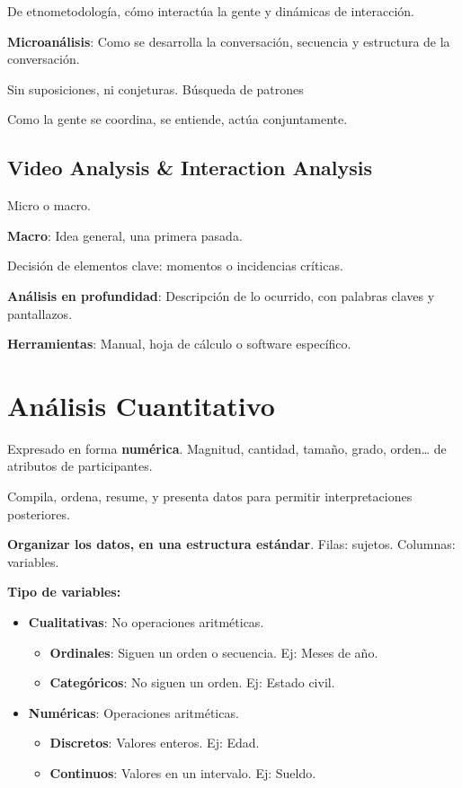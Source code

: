 \documentclass[12pt]{report} %
\begin{document}
De etnometodología, cómo interactúa la gente y dinámicas de interacción.

\textbf{Microanálisis}: Como se desarrolla la conversación, secuencia y
estructura de la conversación.

Sin suposiciones, ni conjeturas. Búsqueda de patrones

Como la gente se coordina, se entiende, actúa conjuntamente.

\subsection{Video Analysis \& Interaction
Analysis}

Micro o macro.

\textbf{Macro}: Idea general, una primera pasada.

Decisión de elementos clave: momentos o incidencias críticas.

\textbf{Análisis en profundidad}: Descripción de lo ocurrido, con
palabras claves y pantallazos.

\textbf{Herramientas}: Manual, hoja de cálculo o software específico.

\section{Análisis Cuantitativo}

Expresado en forma \textbf{numérica}. Magnitud, cantidad, tamaño, grado,
orden\ldots{} de atributos de participantes.

Compila, ordena, resume, y presenta datos para permitir interpretaciones
posteriores.

\textbf{Organizar los datos, en una estructura estándar}. Filas: sujetos. Columnas: variables.

\textbf{Tipo de variables:}

\begin{itemize}

\item
  \textbf{Cualitativas}: No operaciones aritméticas.

  \begin{itemize}
  
  \item
    \textbf{Ordinales}: Siguen un orden o secuencia. Ej: Meses de año.
  \item
    \textbf{Categóricos}: No siguen un orden. Ej: Estado civil.
  \end{itemize}
\item
  \textbf{Numéricas}: Operaciones aritméticas.

  \begin{itemize}
  
  \item
    \textbf{Discretos}: Valores enteros. Ej: Edad.
  \item
    \textbf{Continuos}: Valores en un intervalo. Ej: Sueldo.
  \end{itemize}
\end{itemize}
\end{document}
